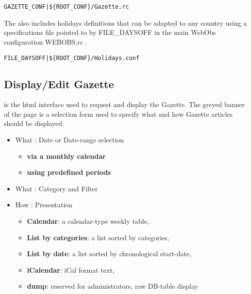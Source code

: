 \begin{lstlisting}[title=\wofile{WEBOBS.rc} (excerpt)]
GAZETTE_CONF|${ROOT_CONF}/Gazette.rc
\end{lstlisting}





The  also includes holidays definitions that can be adapted to any country using 
a specifications file pointed to by FILE\_DAYSOFF in the main WebObs configuration WEBOBS.rc .

\begin{lstlisting}[title=\wofile{WEBOBS.rc} (excerpt)]
FILE_DAYSOFF|${ROOT_CONF}/Holidays.conf
\end{lstlisting}



\subsection{Display/Edit Gazette}

 is the html interface used to request and display the Gazette. 
The greyed banner of the page is a selection form used to specify what and how Gazette articles should
be displayed: 
\begin{itemize}
\item What : Date or Date-range selection 
	\begin{itemize}
	\item \textbf{via a monthly calendar}
	\item \textbf{using predefined periods}
	\end{itemize}
\item What : Category and Filter
\item How : Presentation
	\begin{itemize}
	\item \textbf{Calendar}: a calendar-type weekly table,
	\item \textbf{List by categories}: a list sorted by categories,
	\item \textbf{List by date}: a list sorted by chronological start-date,
	\item \textbf{iCalendar}: iCal format text,
	\item \textbf{dump}: reserved for administrators, raw DB-table display
	\end{itemize}
\end{itemize}

